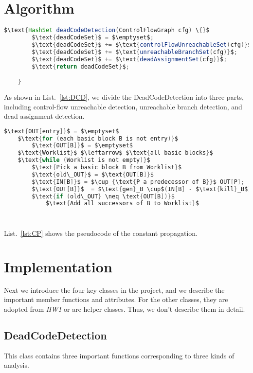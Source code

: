 \documentclass[conference]{IEEEtran}
\begin{document}
\section{Algorithm}
\begin{lstlisting}[label=lst:DCD, caption=Algorithm for DeadCodeDetection, language=java, mathescape=true, numbers=none]
    $\text{HashSet deadCodeDetection(ControlFlowGraph cfg) \{}$
        $\text{deadCodeSet}$ = $\emptyset$;
        $\text{deadCodeSet}$ += $\text{controlFlowUnreachableSet(cfg)}$;
        $\text{deadCodeSet}$ += $\text{unreachableBranchSet(cfg)}$;
        $\text{deadCodeSet}$ += $\text{deadAssignmentSet(cfg)}$;
        $\text{return deadCodeSet}$;

    }

\end{lstlisting}

As shown in List.~\ref{lst:DCD}, we divide the DeadCodeDetection into three parts, including control-flow unreachable detection, unreachable branch detection, and dead assignment detection.


\begin{lstlisting}[label=lst:CP, caption=Algorithm for ConstantPropagation, language=java, mathescape=true, numbers=none]
    $\text{OUT[entry]}$ = $\emptyset$
    $\text{for (each basic block B is not entry)}$
        $\text{OUT[B]}$ = $\emptyset$
    $\text{Worklist}$ $\leftarrow$ $\text{all basic blocks}$
    $\text{while (Worklist is not empty)}$
        $\text{Pick a basic block B from Worklist}$
        $\text{old\_OUT}$ = $\text{OUT[B]}$
        $\text{IN[B]}$ = $\cup_{\text{P a predecessor of B}}$ OUT[P];
        $\text{OUT[B]}$  = $\text{gen}_B \cup$(IN[B] - $\text{kill}_B$);
        $\text{if (old\_OUT} \neq \text{OUT[B])}$
            $\text{Add all successors of B to Worklist}$
        
        
\end{lstlisting}
List.~\ref{lst:CP} shows the pseudocode of the constant propagation.


\section{Implementation}\label{sec:imp}
Next we introduce the four key classes in the project, and we describe the important member functions and attributes.
For the other classes, they are adopted from \textit{HW1} or are helper classes. Thus, we don't describe them in detail.

\subsection{DeadCodeDetection}
This class contains three important functions corresponding to three kinds of analysis.
\end{document}
